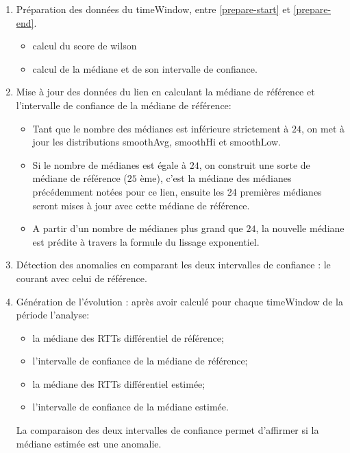 \begin{enumerate}
	\item Préparation des données du timeWindow, entre \ref{prepare-start} et \ref{prepare-end}.
	
	\begin{itemize}
		\item calcul du score de wilson
		\item calcul de la médiane et de son intervalle de confiance.
	\end{itemize}
	
	
	\item Mise à jour des données du lien en calculant la médiane de référence et l'intervalle de confiance de la médiane de référence:
	\begin{itemize}
		\item Tant que le nombre des médianes est inférieure strictement  à $ 24 $, on met à jour les distributions smoothAvg, smoothHi et smoothLow.
		
		\item Si le nombre de médianes est égale à $ 24 $, on construit une sorte de médiane de  référence ($ 25 $ ème), c'est la médiane des médianes précédemment notées pour ce lien, ensuite les 24 premières médianes seront mises à jour avec cette médiane de référence.
		\item A partir d'un nombre de médianes plus grand que $ 24 $, la nouvelle médiane est prédite à travers la formule du lissage exponentiel. 
	\end{itemize}
	\item Détection des anomalies en comparant les deux intervalles de confiance : le courant avec celui de référence.
	\item Génération de l'évolution : après avoir calculé pour chaque timeWindow de la période l'analyse:
	
	\begin{itemize}
		\item la médiane des RTTs différentiel de référence;
		\item l'intervalle de confiance de la médiane de référence;
		\item la médiane des RTTs différentiel estimée;
		\item l'intervalle de confiance  de la médiane estimée.
	\end{itemize}
	La comparaison des deux intervalles de confiance permet d'affirmer si la médiane estimée est une anomalie.
\end{enumerate}


